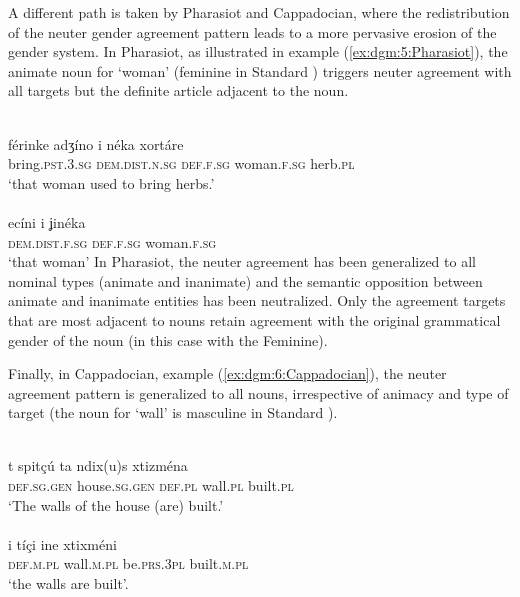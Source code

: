 \documentclass[output=collectionpaper]{langsci/langscibook}
\begin{document}
A different path is taken by Pharasiot and Cappadocian, where the redistribution of the neuter gender agreement pattern leads to a more pervasive erosion of the gender system. In Pharasiot,  as illustrated in example (\ref{ex:dgm:5:Pharasiot}), the animate noun for `woman' (feminine in Standard ) triggers neuter agreement with all targets but the definite article adjacent to the noun.

\ea\label{ex:dgm:5:Pharasiot}
\ea
{}\\
\gll f\'erinke adʒ\'ino i n\'eka xort\'are \\
bring.\textsc{pst.3.sg} \textsc{dem.dist.n.sg} \textsc{def.f.sg} woman.\textsc{f.sg} herb.\textsc{pl} \\
\glt `that woman used to bring herbs.'\\
\ex
{}\\
 \gll ec\'ini i ʝin\'eka \\
 \textsc{dem.dist.f.sg} \textsc{def.f.sg} woman.\textsc{f.sg} \\
 \glt `that woman'
\z
\z
In Pharasiot, the neuter agreement has been generalized to all nominal types (animate and inanimate) and the semantic opposition between animate and inanimate entities has been neutralized. Only the agreement targets that are most adjacent to nouns retain agreement with the original grammatical gender of the noun (in this case with the Feminine).

Finally, in Cappadocian, example (\ref{ex:dgm:6:Cappadocian}), the neuter agreement pattern is generalized to all nouns, irrespective of animacy and type of target (the noun for `wall' is masculine in Standard ).

\ea\label{ex:dgm:6:Cappadocian}
\ea
{}\\
\gll t spit\c{c}\'u ta ndix(u)s xtizm\'ena \\
\textsc{def.sg.gen} house.\textsc{sg.gen} \textsc{def.pl} wall.\textsc{pl} built.\textsc{pl} \\
\glt `The walls of the house (are) built.'\\
\ex
{}\\
\gll i t\'i\c{c}i ine xtixm\'eni \\
\textsc{def.m.pl} wall\textsc{.m.pl} be.\textsc{prs.3pl} built.\textsc{m.pl} \\
\glt `the walls are built'.
\z
\z
\end{document}
